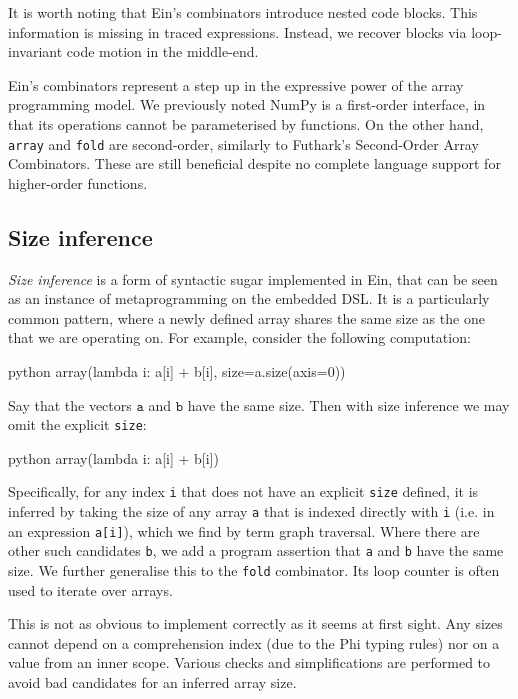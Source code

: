 It is worth noting that Ein's combinators introduce nested code blocks. This information is missing in traced expressions. Instead, we recover blocks via loop-invariant code motion in the middle-end.

Ein's combinators represent a step up in the expressive power of the array programming model. We previously noted NumPy is a first-order interface, in that its operations cannot be parameterised by functions. On the other hand, \texttt{array} and \texttt{fold} are second-order, similarly to Futhark's Second-Order Array Combinators. These are still beneficial despite no complete language support for higher-order functions.

\subsection{Size inference}

\textit{Size inference} is a form of syntactic sugar implemented in Ein, that can be seen as an instance of metaprogramming on the embedded DSL. It is a particularly common pattern, where a newly defined array shares the same size as the one that we are operating on. For example, consider the following computation:
\begin{center} 
\begin{cminted}{python}
array(lambda i: a[i] + b[i], size=a.size(axis=0))
\end{cminted} 
\end{center}
Say that the vectors $\texttt{a}$ and $\texttt{b}$ have the same size. Then with size inference we may omit the explicit \texttt{size}:
\begin{center} 
\begin{cminted}{python}
array(lambda i: a[i] + b[i])
\end{cminted} 
\end{center}
Specifically, for any index \texttt{i} that does not have an explicit \texttt{size} defined, it is inferred by taking the size of any array \texttt{a} that is indexed directly with \texttt{i} (i.e. in an expression \texttt{a[i]}), which we find by term graph traversal. Where there are other such candidates \texttt{b}, we add a program assertion that \texttt{a} and \texttt{b} have the same size. We further generalise this to the \texttt{fold} combinator. Its loop counter is often used to iterate over arrays.

This is not as obvious to implement correctly as it seems at first sight. Any sizes cannot depend on a comprehension index (due to the Phi typing rules) nor on a value from an inner scope. Various checks and simplifications are performed to avoid bad candidates for an inferred array size.

